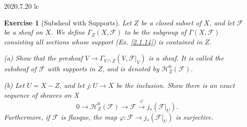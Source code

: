 \documentclass[12pt]{amsart}
\newtheorem{exe}{Exercise}[subsection]
\begin{document}
2020.7.20 lc

\begin{exe}[Subsheaf with Supports]
	\label{2.1.20}
	Let $Z$ be a closed subset of $X$, and let $\mathscr{F}$ be a sheaf on $X$. We define $\Gamma_Z(X,\mathscr{F})$ to be the subgroup of $\Gamma(X,\mathscr{F})$ consisting all sections whose support \textup{(Ex. \ref{2.1.14})} is contained in $Z$.
	
	(a) Show that the presheaf $V\to\Gamma_{V\cap Z}(V,\mathscr{F}|_V)$ is a sheaf. It is called the subsheaf of $\mathscr{F}$ with supports in $Z$, and is denoted by $\mathscr{H}_Z^0(\mathscr{F})$.
	
	(b) Let $U=X-Z$, and let $j:U\to X$ be the inclusion. Show there is an exact sequence of sheaves on X$$0\to\mathscr{H}_Z^0(\mathscr{F})\to\mathscr{F}\xrightarrow{\varphi} j_*(\mathscr{F}|_U).$$Furthermore, if $\mathscr{F}$ is flasque, the map $\varphi:\mathscr{F}\to j_*(\mathscr{F}|_U)$ is surjective.
\end{exe}
\end{document}
